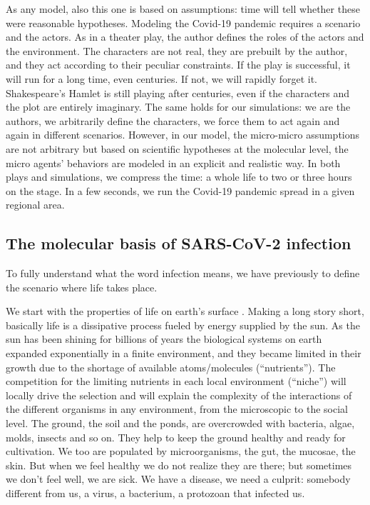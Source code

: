 \documentclass[graybox]{svmult}
\begin{document}
As any model, also this one is based on assumptions: time will tell whether these were reasonable hypotheses. Modeling the Covid-19 pandemic requires a scenario and the actors. As in a theater play, the author defines the roles of the actors and the environment. The characters are not real, they are prebuilt by the author, and they act according to their peculiar constraints. If the play is successful, it will run for a long time, even centuries. If not, we will rapidly forget it. Shakespeare’s Hamlet is still playing after centuries, even if the characters and the plot are entirely imaginary. The same holds for our simulations: we are the authors, we arbitrarily define the characters, we force them to act again and again in different scenarios. However, in our model, the micro-micro assumptions are not arbitrary but based on scientific hypotheses at the molecular level, the micro agents’ behaviors are modeled in an explicit and realistic way. In both plays and simulations, we compress the time: a whole life to two or three hours on the stage. In a few seconds, we run the Covid-19 pandemic spread in a given regional area.



\subsection{The molecular basis of SARS-CoV-2 infection}
\label{biochem}

To fully understand what the word infection means, we have previously to define the scenario where life takes place.

We start with the properties of life on earth's surface \cite{pescarmona2002life}. 
Making a long story short, basically life is a dissipative process fueled by energy supplied by the sun. As the sun has been shining for billions of years the biological systems on earth expanded exponentially in a finite environment, and they became limited in their growth due to the shortage of available atoms/molecules (``nutrients'').
The competition for the limiting nutrients in each local environment (``niche'') will locally drive the selection and will explain the complexity of the interactions of the different organisms in any environment, from the microscopic to the social level.
The ground, the soil and the ponds, are overcrowded with bacteria, algae, molds, insects and so on. They help to keep the ground healthy and ready for cultivation. 
We too are populated by microorganisms, the gut, the mucosae, the skin. But when we feel healthy we do not realize they are there; but sometimes we don't feel well, we are sick. We have a disease, we need a culprit: somebody different from us, a virus, a bacterium, a protozoan that infected us.
\end{document}
